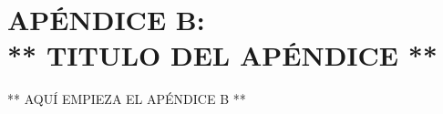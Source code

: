 \chapter*{APÉNDICE B:\\ ** TITULO DEL APÉNDICE **}
\thispagestyle{empty}

** AQUÍ EMPIEZA EL APÉNDICE B **